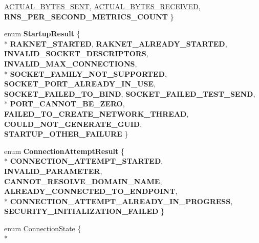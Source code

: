 \begin{DoxyCompactItemize}
\hyperlink{namespace_rak_net_ada2bfa976ee507869dc9f3ef0c11134da6a585c7ce759e95ace406b2c52f0b66b}{A\-C\-T\-U\-A\-L\-\_\-\-B\-Y\-T\-E\-S\-\_\-\-S\-E\-N\-T}, 
\hyperlink{namespace_rak_net_ada2bfa976ee507869dc9f3ef0c11134daa19e76a59b6f2192b6fe57a5a2b7a2ff}{A\-C\-T\-U\-A\-L\-\_\-\-B\-Y\-T\-E\-S\-\_\-\-R\-E\-C\-E\-I\-V\-E\-D}, 
{\bfseries R\-N\-S\-\_\-\-P\-E\-R\-\_\-\-S\-E\-C\-O\-N\-D\-\_\-\-M\-E\-T\-R\-I\-C\-S\-\_\-\-C\-O\-U\-N\-T}
 \}
\item 
enum {\bfseries Startup\-Result} \{ \\*
{\bfseries R\-A\-K\-N\-E\-T\-\_\-\-S\-T\-A\-R\-T\-E\-D}, 
{\bfseries R\-A\-K\-N\-E\-T\-\_\-\-A\-L\-R\-E\-A\-D\-Y\-\_\-\-S\-T\-A\-R\-T\-E\-D}, 
{\bfseries I\-N\-V\-A\-L\-I\-D\-\_\-\-S\-O\-C\-K\-E\-T\-\_\-\-D\-E\-S\-C\-R\-I\-P\-T\-O\-R\-S}, 
{\bfseries I\-N\-V\-A\-L\-I\-D\-\_\-\-M\-A\-X\-\_\-\-C\-O\-N\-N\-E\-C\-T\-I\-O\-N\-S}, 
\\*
{\bfseries S\-O\-C\-K\-E\-T\-\_\-\-F\-A\-M\-I\-L\-Y\-\_\-\-N\-O\-T\-\_\-\-S\-U\-P\-P\-O\-R\-T\-E\-D}, 
{\bfseries S\-O\-C\-K\-E\-T\-\_\-\-P\-O\-R\-T\-\_\-\-A\-L\-R\-E\-A\-D\-Y\-\_\-\-I\-N\-\_\-\-U\-S\-E}, 
{\bfseries S\-O\-C\-K\-E\-T\-\_\-\-F\-A\-I\-L\-E\-D\-\_\-\-T\-O\-\_\-\-B\-I\-N\-D}, 
{\bfseries S\-O\-C\-K\-E\-T\-\_\-\-F\-A\-I\-L\-E\-D\-\_\-\-T\-E\-S\-T\-\_\-\-S\-E\-N\-D}, 
\\*
{\bfseries P\-O\-R\-T\-\_\-\-C\-A\-N\-N\-O\-T\-\_\-\-B\-E\-\_\-\-Z\-E\-R\-O}, 
{\bfseries F\-A\-I\-L\-E\-D\-\_\-\-T\-O\-\_\-\-C\-R\-E\-A\-T\-E\-\_\-\-N\-E\-T\-W\-O\-R\-K\-\_\-\-T\-H\-R\-E\-A\-D}, 
{\bfseries C\-O\-U\-L\-D\-\_\-\-N\-O\-T\-\_\-\-G\-E\-N\-E\-R\-A\-T\-E\-\_\-\-G\-U\-I\-D}, 
{\bfseries S\-T\-A\-R\-T\-U\-P\-\_\-\-O\-T\-H\-E\-R\-\_\-\-F\-A\-I\-L\-U\-R\-E}
 \}
\item 
enum {\bfseries Connection\-Attempt\-Result} \{ \\*
{\bfseries C\-O\-N\-N\-E\-C\-T\-I\-O\-N\-\_\-\-A\-T\-T\-E\-M\-P\-T\-\_\-\-S\-T\-A\-R\-T\-E\-D}, 
{\bfseries I\-N\-V\-A\-L\-I\-D\-\_\-\-P\-A\-R\-A\-M\-E\-T\-E\-R}, 
{\bfseries C\-A\-N\-N\-O\-T\-\_\-\-R\-E\-S\-O\-L\-V\-E\-\_\-\-D\-O\-M\-A\-I\-N\-\_\-\-N\-A\-M\-E}, 
{\bfseries A\-L\-R\-E\-A\-D\-Y\-\_\-\-C\-O\-N\-N\-E\-C\-T\-E\-D\-\_\-\-T\-O\-\_\-\-E\-N\-D\-P\-O\-I\-N\-T}, 
\\*
{\bfseries C\-O\-N\-N\-E\-C\-T\-I\-O\-N\-\_\-\-A\-T\-T\-E\-M\-P\-T\-\_\-\-A\-L\-R\-E\-A\-D\-Y\-\_\-\-I\-N\-\_\-\-P\-R\-O\-G\-R\-E\-S\-S}, 
{\bfseries S\-E\-C\-U\-R\-I\-T\-Y\-\_\-\-I\-N\-I\-T\-I\-A\-L\-I\-Z\-A\-T\-I\-O\-N\-\_\-\-F\-A\-I\-L\-E\-D}
 \}
\item 
enum \hyperlink{namespace_rak_net_a84a0fb005391f71130dd341f77f62138}{Connection\-State} \{ \\*

\end{DoxyCompactItemize}
